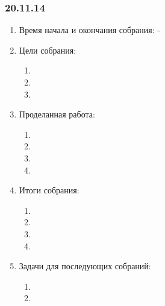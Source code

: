 \subsubsection{20.11.14}

\begin{enumerate}
	\item Время начала и окончания собрания:
	-
	\item Цели собрания:
	\begin{enumerate}
	  \item 
	  
	  \item 
	  
	  \item 
	  
    \end{enumerate}
	\item Проделанная работа:
	\begin{enumerate}
	  \item
      
      \item  
      
      \item  
      
      \item   
          
    \end{enumerate}
    
	\item Итоги собрания: 
	\begin{enumerate}
	  \item 
	  
      \item 
      
      \item 
      
      \item 
      
    \end{enumerate}
    
	\item Задачи для последующих собраний:
	\begin{enumerate}
	  \item 
	  
	  \item 

    \end{enumerate}     
\end{enumerate}
\fillpage